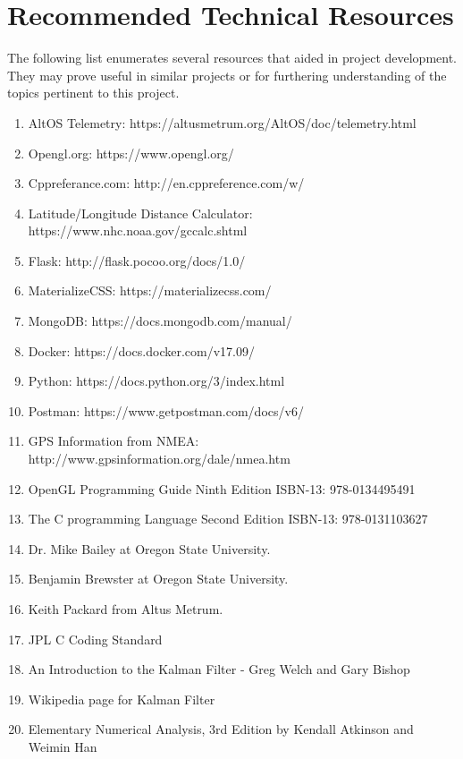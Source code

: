 \documentclass[onecolumn, draftclsnofoot,10pt, compsoc]{IEEEtran}
\begin{document}
\section{Recommended Technical Resources}
The following list enumerates several resources that aided in project development. They may prove useful in similar projects or for furthering understanding of the topics pertinent to this project. 
\begin{enumerate}
   \item AltOS Telemetry: https://altusmetrum.org/AltOS/doc/telemetry.html
   \item Opengl.org: https://www.opengl.org/
   \item Cppreferance.com: http://en.cppreference.com/w/
   \item Latitude/Longitude Distance Calculator: https://www.nhc.noaa.gov/gccalc.shtml
   \item Flask: http://flask.pocoo.org/docs/1.0/
   \item MaterializeCSS: https://materializecss.com/
   \item MongoDB: https://docs.mongodb.com/manual/
   \item Docker: https://docs.docker.com/v17.09/
   \item Python: https://docs.python.org/3/index.html
   \item Postman: https://www.getpostman.com/docs/v6/
   \item GPS Information from NMEA: http://www.gpsinformation.org/dale/nmea.htm
   \item OpenGL Programming Guide Ninth Edition ISBN-13: 978-0134495491
   \item The C programming Language Second Edition ISBN-13: 978-0131103627
   \item Dr. Mike Bailey at Oregon State University.
   \item Benjamin Brewster at Oregon State University.
   \item Keith Packard from Altus Metrum.
   \item JPL C Coding Standard
   \item An Introduction to the Kalman Filter - Greg Welch and Gary Bishop
   \item Wikipedia page for Kalman Filter
   \item Elementary Numerical Analysis, 3rd Edition by Kendall Atkinson and Weimin Han
\end{enumerate}
\end{document}
